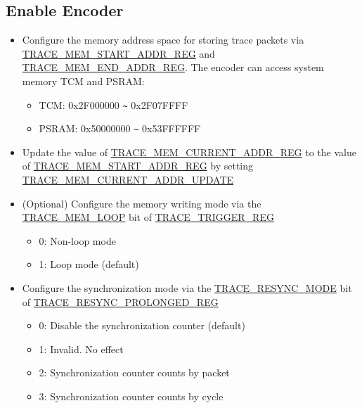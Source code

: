\documentclass[main\_\_EN.tex]{subfiles}
\begin{document}
\subsection{Enable Encoder}


\begin{itemize}
    \item Configure the memory address space for storing trace packets via \hyperref[regdesc:TRACEMEMSTARTADDRREG]{TRACE\_MEM\_START\_ADDR\_REG} and \hyperref[regdesc:TRACEMEMENDADDRREG]{TRACE\_MEM\_END\_ADDR\_REG}. The encoder can access system memory TCM and PSRAM:
        \begin{itemize}
            \item TCM: 0x2F000000 \verb+~+ 0x2F07FFFF
            \item PSRAM: 0x50000000 \verb+~+ 0x53FFFFFF
        \end{itemize}
    \item Update the value of \hyperref[regdesc:TRACEMEMCURRENTADDRREG]{TRACE\_MEM\_CURRENT\_ADDR\_REG} to the value of \hyperref[regdesc:TRACEMEMSTARTADDRREG]{TRACE\_MEM\_START\_ADDR\_REG} by setting \hyperref[fielddesc:TRACEMEMCURRENTADDRUPDATE]{TRACE\_MEM\_CURRENT\_ADDR\_UPDATE}


    \item (Optional) Configure the memory writing mode via the \hyperref[fielddesc:TRACEMEMLOOP]{TRACE\_MEM\_LOOP} bit of \hyperref[regdesc:TRACETRIGGERREG]{TRACE\_TRIGGER\_REG}
        \begin{itemize}
            \item 0: Non-loop mode
            \item 1: Loop mode (default)
        \end{itemize}

    \item Configure the synchronization mode via the \hyperref[fielddesc:TRACERESYNCMODE]{TRACE\_RESYNC\_MODE} bit of \hyperref[regdesc:TRACERESYNCPROLONGEDREG]{TRACE\_RESYNC\_PROLONGED\_REG}
            \begin{itemize}
                    \item 0: Disable the synchronization counter (default)
                    \item 1: Invalid. No effect
                    \item 2: Synchronization counter counts by packet
                    \item 3: Synchronization counter counts by cycle
            \end{itemize}


\end{itemize}
\end{document}
